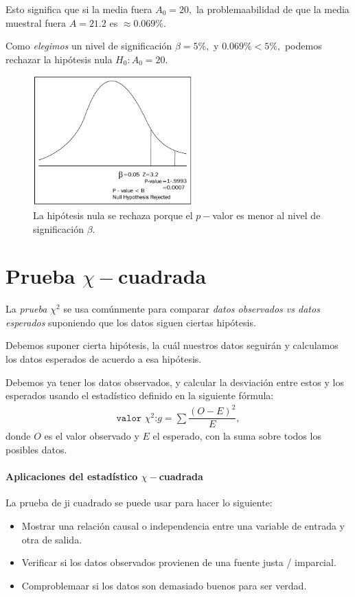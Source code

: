  Esto significa que si la media fuera $A_{0}=20,$ la problemaabilidad de que la media muestral fuera $A=21.2$ es $\approx 0.069\%.$
 

 Como \emph{elegimos} un nivel de significación $\beta=5\%,$ y $0.069\% < 5\%,$ podemos rechazar la hipótesis nula $H_{0}: A_{0}=20.$


\begin{figure}[h]
 \centering
 \includegraphics[height=5cm,keepaspectratio=true]{./images/kum0405.png}
 \caption{La hipótesis nula se rechaza porque el $p-$valor es menor al nivel de significación $\beta$.}
 \label{fig:0405}
\end{figure}


\section{Prueba $\chi-$cuadrada}

La \emph{prueba $\chi^{2}$} se usa comúnmente para comparar \emph{datos observados vs datos esperados} suponiendo que los datos siguen ciertas hipótesis.


Debemos suponer cierta hipótesis, la cuál nuestros datos seguirán y calculamos los datos esperados de acuerdo a esa hipótesis.


Debemos ya tener los datos observados, y calcular la desviación entre estos y los esperados usando el estadístico definido en la siguiente fórmula:
\begin{align}
 \texttt{valor }\chi^{2}\texttt{:} g= \sum\dfrac{\left( O-E \right)^{2}}{E},
\end{align}
donde $O$ es el valor observado y $E$ el esperado, con la suma sobre todos los posibles datos.

\paragraph{Aplicaciones del estadístico $\chi-$cuadrada}
La prueba de ji cuadrado se puede usar para hacer lo siguiente:
\begin{itemize}
\item Mostrar una relación causal o independencia entre una variable de entrada y otra de salida.  
\item Verificar si los datos observados provienen de una fuente justa / imparcial. 
\item Comproblemaar si los datos son demasiado buenos para ser verdad.
\end{itemize}


